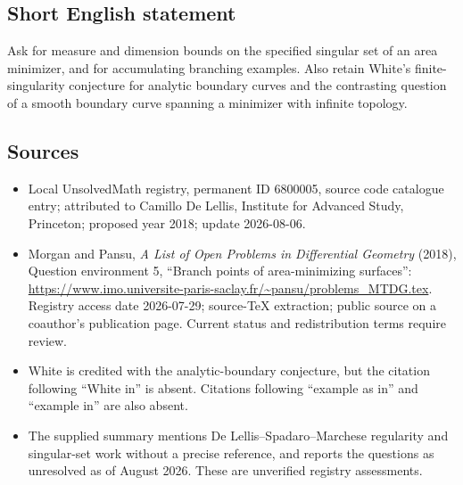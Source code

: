 \documentclass[11pt]{article}
\begin{document}
\subsection{Short English statement}
Ask for measure and dimension bounds on the specified singular set of an area minimizer, and for accumulating branching examples. Also retain White's finite-singularity conjecture for analytic boundary curves and the contrasting question of a smooth boundary curve spanning a minimizer with infinite topology.
\subsection{Sources}
\begin{itemize}
\item Local UnsolvedMath registry, permanent ID 6800005, source code catalogue entry; attributed to Camillo De Lellis, Institute for Advanced Study, Princeton; proposed year 2018; update 2026-08-06.
\item Morgan and Pansu, \emph{A List of Open Problems in Differential Geometry} (2018), Question environment 5, ``Branch points of area-minimizing surfaces'': \url{https://www.imo.universite-paris-saclay.fr/~pansu/problems_MTDG.tex}. Registry access date 2026-07-29; source-TeX extraction; public source on a coauthor's publication page. Current status and redistribution terms require review.
\item White is credited with the analytic-boundary conjecture, but the citation following ``White in'' is absent. Citations following ``example as in'' and ``example in'' are also absent.
\item The supplied summary mentions De Lellis--Spadaro--Marchese regularity and singular-set work without a precise reference, and reports the questions as unresolved as of August 2026. These are unverified registry assessments.
\end{itemize}
\end{document}
